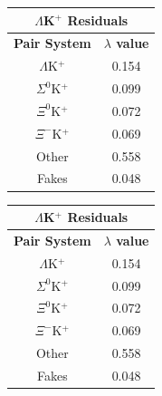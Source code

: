 \documentclass[../AnalysisNoteJBuxton.tex]{subfiles}
\begin{document}
\begin{table}[htbp]
 
 \begin{minipage}{0.3\textwidth}
  \centering
  \begin{tabular}{|c|c|}
   \multicolumn{2}{c}{$\Lambda$K$^{+}$ Residuals} \\
   \hline
   \textbf{Pair System} & \textbf{$\lambda$ value} \\
   \hline
   $\Lambda$K$^{+}$ & 0.154 \\
   $\Sigma^{0}$K$^{+}$ & 0.099 \\
   $\Xi^{0}$K$^{+}$ & 0.072 \\
   $\Xi^{-}$K$^{+}$ & 0.069 \\
   Other & 0.558 \\
   Fakes & 0.048 \\
   \hline
  \end{tabular}
 \end{minipage}
 \begin{minipage}{0.3\textwidth}
  \centering
  \begin{tabular}{|c|c|}
   \multicolumn{2}{c}{$\Lambda$K$^{+}$ Residuals} \\
   \hline
   \textbf{Pair System} & \textbf{$\lambda$ value} \\
   \hline
   $\Lambda$K$^{+}$ & 0.154 \\
   $\Sigma^{0}$K$^{+}$ & 0.099 \\
   $\Xi^{0}$K$^{+}$ & 0.072 \\
   $\Xi^{-}$K$^{+}$ & 0.069 \\
   Other & 0.558 \\
   Fakes & 0.048 \\
   \hline
  \end{tabular}
 \end{minipage} 
 
 \label{tab:LambdaValues_3Res_LamKchP}
\end{table}
\end{document}
